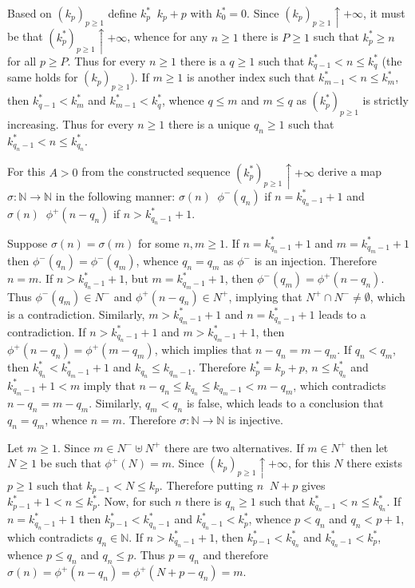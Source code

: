 \documentclass[a4paper]{article}
\newcommand{\brac}[1]{\left ( #1 \right )}
\newcommand{\defn}{\mathop{\overset{\Delta}{=}}\nolimits}
\begin{document}
Based on $\brac{k_p}_{p\geq 1}$ define $k^*_p\defn k_p+p$ with $k^*_0=0$. Since $\brac{k_p}_{p\geq1}\uparrow +\infty$, it must be that $\brac{k^*_p}_{p\geq1}\uparrow +\infty$, whence for any $n\geq 1$ there is $P\geq 1$ such that $k^*_p\geq n$ for all $p\geq P$. Thus for every $n\geq1$ there is a $q\geq 1$ such that $k^*_{q-1}<n\leq k^*_q$ (the same holds for $\brac{k_p}_{p\geq 1}$). If $m\geq 1$ is another index such that $k^*_{m-1}<n\leq k^*_m$, then $k^*_{q-1}<k^*_m$ and $k^*_{m-1}<k^*_q$, whence $q\leq m$ and $m\leq q$ as $\brac{k^*_p}_{p\geq 1}$ is strictly increasing. Thus for every $n\geq1$ there is a unique $q_n\geq 1$ such that $k^*_{q_n-1}<n\leq k^*_{q_n}$.

For this $A>0$ from the constructed sequence $\brac{k^*_p}_{p\geq1}\uparrow +\infty$ derive a map $\sigma:\mathbb{N}\to\mathbb{N}$ in the following manner: $\sigma\brac{n}\defn \phi^-\brac{q_n}$ if $n=k^*_{q_n-1}+1$ and $\sigma\brac{n}\defn \phi^+\brac{n-q_n}$ if $n>k^*_{q_n-1}+1$.

Suppose $\sigma\brac{n} = \sigma\brac{m}$ for some $n,m\geq 1$. If $n=k^*_{q_n-1}+1$ and $m=k^*_{q_m-1}+1$ then $\phi^-\brac{q_n}=\phi^-\brac{q_m}$, whence $q_n=q_m$ as $\phi^-$ is an injection. Therefore $n=m$. If $n>k^*_{q_n-1}+1$, but $m=k^*_{q_m-1}+1$, then $\phi^-\brac{q_m}=\phi^+\brac{n-q_n}$. Thus $\phi^-\brac{q_m}\in N^-$ and $\phi^+\brac{n-q_n}\in N^+$, implying that $N^+\cap N^-\neq\emptyset$, which is a contradiction. Similarly, $m>k^*_{q_m-1}+1$ and $n=k^*_{q_n-1}+1$ leads to a contradiction. If $n>k^*_{q_n-1}+1$ and $m>k^*_{q_m-1}+1$, then $\phi^+\brac{n-q_n}=\phi^+\brac{m-q_m}$, which implies that $n-q_n = m-q_m$. If $q_n<q_m$, then $k^*_{q_n}<k^*_{q_m-1}+1$ and $k_{q_n}\leq k_{q_m-1}$. Therefore $k^*_p=k_p+p$, $n\leq k^*_{q_n}$ and $k^*_{q_m-1}+1<m$ imply that $n-q_n\leq k_{q_n}\leq k_{q_m-1}<m-q_m$, which contradicts $n-q_n = m-q_m$. Similarly, $q_m<q_n$ is false, which leads to a conclusion that $q_n = q_m$, whence $n=m$. Therefore $\sigma:\mathbb{N}\to\mathbb{N}$ is injective.

Let $m\geq1$. Since $m\in N^-\uplus N^+$ there are two alternatives. If $m\in N^+$ then let $N\geq1$ be such that $\phi^+\brac{N}=m$. Since $\brac{k_p}_{p\geq 1}\uparrow +\infty$, for this $N$ there exists $p\geq 1$ such that $k_{p-1}<N\leq k_p$. Therefore putting $n\defn N+p$ gives $k^*_{p-1}+1<n\leq k^*_p$. Now, for such $n$ there is $q_n\geq 1$ such that $k^*_{q_n-1}<n\leq k^*_{q_n}$. If $n=k^*_{q_n-1}+1$ then $k^*_{p-1}<k^*_{q_n-1}$ and $k^*_{q_n-1}<k^*_p$, whence $p<q_n$ and $q_n<p+1$, which contradicts $q_n\in \mathbb{N}$. If $n>k^*_{q_n-1}+1$, then $k^*_{p-1}<k^*_{q_n}$ and $k^*_{q_n-1}<k^*_p$, whence $p\leq q_n$ and $q_n\leq p$. Thus $p=q_n$ and therefore $\sigma\brac{n} = \phi^+\brac{n-q_n} = \phi^+\brac{N+p-q_n}=m$.
\end{document}
